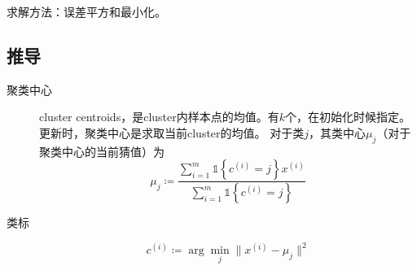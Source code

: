 \documentclass{ctexart}
\begin{document}
求解方法：误差平方和最小化。



\subsection{推导}
\label{derivations}
\begin{description}
\item[聚类中心]
cluster centroids，是cluster内样本点的均值。有$k$个，在初始化时候指定。更新时，聚类中心是求取当前cluster的均值。
对于类$j$，其类中心$\mu_j$（对于聚类中心的当前猜值）为
\begin{equation}
\mu_j \coloneqq \frac{\sum\limits_{i=1}^{m}\mathds{1}\left\{c^{\left(i\right)}=j\right\}x^{\left(i\right)}}{\sum\limits_{i=1}^{m}\mathds{1}\left\{c^{\left(i\right)}=j\right\}}
\end{equation}

\item[类标]
\begin{equation}
c^{\left(i\right)}\coloneqq \arg\min\limits_{j}\big\| x^{\left(i\right)}-\mu_{j}\big\|^2
\end{equation}
\end{description}

%


\end{document}
